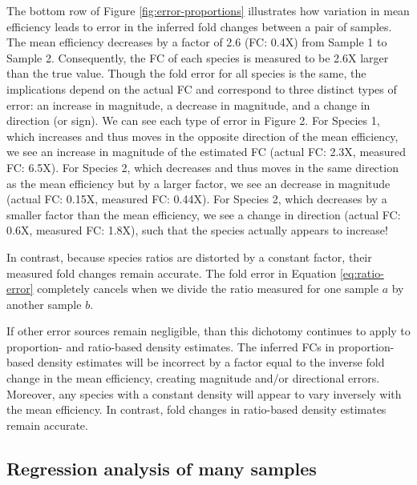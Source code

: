 \documentclass[
]{article}
\theoremstyle{definition}
\theoremstyle{definition}
\theoremstyle{definition}
\theoremstyle{definition}
\theoremstyle{remark}
\begin{document}
The bottom row of Figure \ref{fig:error-proportions} illustrates how variation in mean efficiency leads to error in the inferred fold changes between a pair of samples.
The mean efficiency decreases by a factor of 2.6 (FC: 0.4X) from Sample 1 to Sample 2.
Consequently, the FC of each species is measured to be 2.6X larger than the true value.
Though the fold error for all species is the same, the implications depend on the actual FC and correspond to three distinct types of error: an increase in magnitude, a decrease in magnitude, and a change in direction (or sign).
We can see each type of error in Figure 2.
For Species 1, which increases and thus moves in the opposite direction of the mean efficiency, we see an increase in magnitude of the estimated FC (actual FC: 2.3X, measured FC: 6.5X).
For Species 2, which decreases and thus moves in the same direction as the mean efficiency but by a larger factor, we see an decrease in magnitude (actual FC: 0.15X, measured FC: 0.44X).
For Species 2, which decreases by a smaller factor than the mean efficiency, we see a change in direction (actual FC: 0.6X, measured FC: 1.8X), such that the species actually appears to increase!

In contrast, because species ratios are distorted by a constant factor, their measured fold changes remain accurate.
The fold error in Equation \eqref{eq:ratio-error} completely cancels when we divide the ratio measured for one sample \(a\) by another sample \(b\).

If other error sources remain negligible, than this dichotomy continues to apply to proportion- and ratio-based density estimates.
The inferred FCs in proportion-based density estimates will be incorrect by a factor equal to the inverse fold change in the mean efficiency, creating magnitude and/or directional errors.
Moreover, any species with a constant density will appear to vary inversely with the mean efficiency.
In contrast, fold changes in ratio-based density estimates remain accurate.

\hypertarget{regression-analysis-of-many-samples}{%
\subsection{Regression analysis of many samples}\label{regression-analysis-of-many-samples}}
\end{document}
